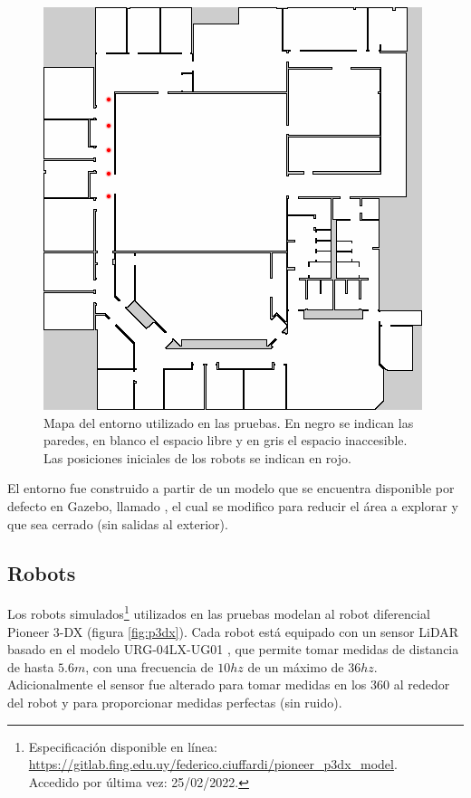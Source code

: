 \begin{figure}[H]
  \center
  \includegraphics[width=0.5\linewidth]{imagenes/willow/0_250000mRobots2.png}
  \caption[Mapa del entorno utilizado en las pruebas.]{Mapa del entorno utilizado en las pruebas. En negro se indican las paredes, en blanco el espacio libre y en gris el espacio inaccesible. Las posiciones iniciales de los robots se indican en rojo.}
  \label{fig:willow}
\end{figure} 

El entorno fue construido a partir de un modelo que se encuentra disponible por
defecto en Gazebo, llamado , el cual se modifico para
reducir el área a explorar y que sea cerrado (sin salidas al exterior).

\subsection{Robots}
Los robots simulados\footnote{Especificación disponible en línea:\\
\url{https://gitlab.fing.edu.uy/federico.ciuffardi/pioneer_p3dx_model}.\\ Accedido por última vez: 25/02/2022.} utilizados en las
pruebas modelan al robot diferencial Pioneer 3-DX \cite{p3dx} (figura
\ref{fig:p3dx}). Cada robot está equipado con un sensor \gls{LiDAR} basado en el
modelo URG-04LX-UG01 \cite{hokuyo}, que permite tomar medidas de distancia de
hasta $5.6m$, con una frecuencia de $10hz$ de un máximo de $36hz$.
Adicionalmente el sensor fue alterado para tomar medidas en los $360$\textdegree
al rededor del robot y para proporcionar medidas perfectas (sin ruido).

